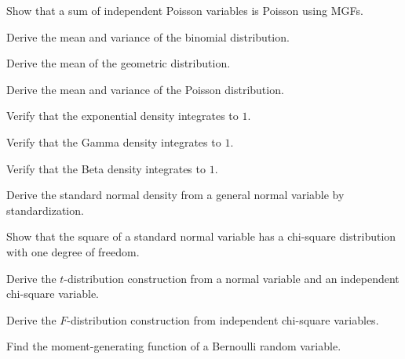 \begin{exercise}[3]
Show that a sum of independent Poisson variables is Poisson using MGFs.
\end{exercise}

\begin{exercise}[3]
Derive the mean and variance of the binomial distribution.
\end{exercise}

\begin{exercise}[3]
Derive the mean of the geometric distribution.
\end{exercise}

\begin{exercise}[3]
Derive the mean and variance of the Poisson distribution.
\end{exercise}

\begin{exercise}[3]
Verify that the exponential density integrates to \(1\).
\end{exercise}

\begin{exercise}[3]
Verify that the Gamma density integrates to \(1\).
\end{exercise}

\begin{exercise}[3]
Verify that the Beta density integrates to \(1\).
\end{exercise}

\begin{exercise}[3]
Derive the standard normal density from a general normal variable by
standardization.
\end{exercise}

\begin{exercise}[3]
Show that the square of a standard normal variable has a chi-square
distribution with one degree of freedom.
\end{exercise}

\begin{exercise}[3]
Derive the \(t\)-distribution construction from a normal variable and an
independent chi-square variable.
\end{exercise}

\begin{exercise}[3]
Derive the \(F\)-distribution construction from independent chi-square
variables.
\end{exercise}

\begin{exercise}[3]
Find the moment-generating function of a Bernoulli random variable.
\end{exercise}

